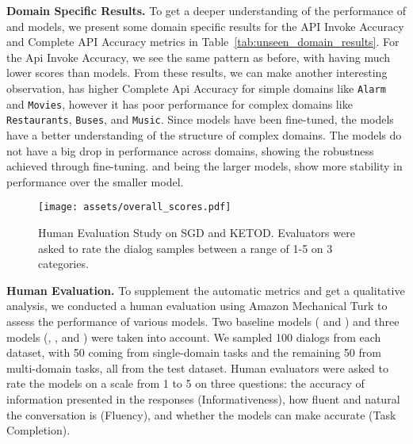

\noindent
\textbf{Domain Specific Results.}
To get a deeper understanding of the performance of {\autotod} and {\oursys} models, we present some domain specific results for the API Invoke Accuracy and Complete API Accuracy metrics in Table~\ref{tab:unseen_domain_results}. For the Api Invoke Accuracy, we see the same pattern as before, with {\autotod} having much lower scores than {\oursys} models. 
From these results, we can make another interesting observation, {\autotod} has higher Complete Api Accuracy for simple domains like \texttt{Alarm} and \texttt{Movies}, however it has poor performance for complex domains like \texttt{Restaurants}, \texttt{Buses}, and \texttt{Music}. 
Since {\oursys} models have been fine-tuned, the models have a better understanding of the structure of complex domains. The models do not have a big drop in performance across domains, showing the robustness achieved through fine-tuning. {\flan} and {\llamai} being the larger models, show more stability in performance over the smaller {\gpt} model. 


\vspace{-5pt}
\begin{figure}
   \centering
   \texttt{[image: assets/overall\_scores.pdf]}
   
   \caption{
       Human Evaluation Study on SGD and KETOD. Evaluators were asked to rate the dialog samples between a range of 1-5 on 3 categories.
   }
   \vspace{-15pt}
   \label{fig:human_evaluation}
\end{figure}
\vspace{-2pt}

\vspace{3pt}
\noindent
\textbf{Human Evaluation.} 
To supplement the automatic metrics and get a qualitative analysis, we conducted a human evaluation using Amazon Mechanical Turk to assess the performance of various models. Two baseline models ({\soloist} and {\autotod}) and three {\oursys} models ({\gpt}, {\llamai}, and {\flan}) were taken into account. We sampled 100 dialogs from each dataset, with 50 coming from single-domain tasks and the remaining 50 from multi-domain tasks, all from the test dataset. Human evaluators were asked to rate the models on a scale from 1 to 5 on three questions: the accuracy of information presented in the responses (Informativeness), how fluent and natural the conversation is (Fluency), and whether the models can make accurate {\apicall} (Task Completion).

